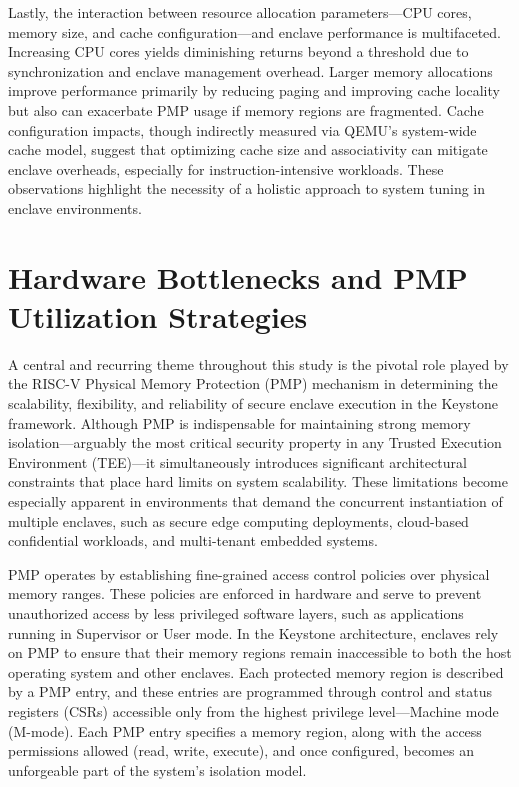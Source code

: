 Lastly, the interaction between resource allocation parameters—CPU cores, memory size, and cache configuration—and enclave performance is multifaceted. Increasing CPU cores yields diminishing returns beyond a threshold due to synchronization and enclave management overhead. Larger memory allocations improve performance primarily by reducing paging and improving cache locality but also can exacerbate PMP usage if memory regions are fragmented. Cache configuration impacts, though indirectly measured via QEMU’s system-wide cache model, suggest that optimizing cache size and associativity can mitigate enclave overheads, especially for instruction-intensive workloads. These observations highlight the necessity of a holistic approach to system tuning in enclave environments.

\section{Hardware Bottlenecks and PMP Utilization Strategies}
A central and recurring theme throughout this study is the pivotal role played by the RISC-V Physical Memory Protection (PMP) mechanism in determining the scalability, flexibility, and reliability of secure enclave execution in the Keystone framework. Although PMP is indispensable for maintaining strong memory isolation—arguably the most critical security property in any Trusted Execution Environment (TEE)—it simultaneously introduces significant architectural constraints that place hard limits on system scalability. These limitations become especially apparent in environments that demand the concurrent instantiation of multiple enclaves, such as secure edge computing deployments, cloud-based confidential workloads, and multi-tenant embedded systems.

PMP operates by establishing fine-grained access control policies over physical memory ranges. These policies are enforced in hardware and serve to prevent unauthorized access by less privileged software layers, such as applications running in Supervisor or User mode. In the Keystone architecture, enclaves rely on PMP to ensure that their memory regions remain inaccessible to both the host operating system and other enclaves. Each protected memory region is described by a PMP entry, and these entries are programmed through control and status registers (CSRs) accessible only from the highest privilege level—Machine mode (M-mode). Each PMP entry specifies a memory region, along with the access permissions allowed (read, write, execute), and once configured, becomes an unforgeable part of the system’s isolation model.

